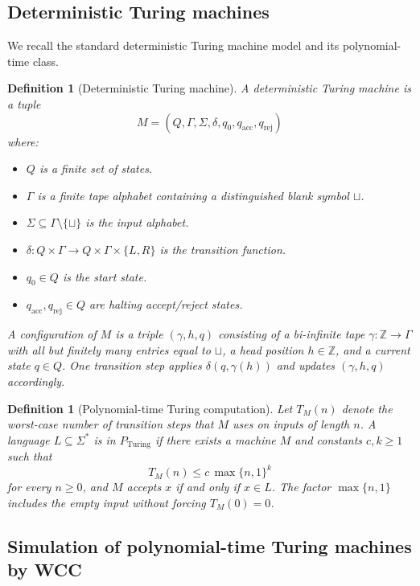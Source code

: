 \documentclass[12pt]{article}
\newcommand{\blank}{\sqcup}
\newtheorem{definition}[theorem]{Definition}
\begin{document}
\subsection{Deterministic Turing machines}

We recall the standard deterministic Turing machine model and its
polynomial-time class.

\begin{definition}[Deterministic Turing machine]
\label{def:tm}
A deterministic Turing machine is a tuple
\[
M = (Q, \Gamma, \Sigma, \delta, q_0, q_{\mathrm{acc}}, q_{\mathrm{rej}})
\]
where:
\begin{itemize}
  \item $Q$ is a finite set of states.
  \item $\Gamma$ is a finite tape alphabet containing a distinguished blank
    symbol $\blank$.
  \item $\Sigma \subseteq \Gamma \setminus \{\blank\}$ is the input alphabet.
  \item $\delta : Q \times \Gamma \to Q \times \Gamma \times \{L,R\}$ is the
    transition function.
  \item $q_0 \in Q$ is the start state.
  \item $q_{\mathrm{acc}}, q_{\mathrm{rej}} \in Q$ are halting accept/reject
    states.
\end{itemize}
A \emph{configuration} of $M$ is a triple $(\gamma, h, q)$ consisting of a
bi-infinite tape $\gamma : \mathbb{Z} \to \Gamma$ with all but finitely many
entries equal to $\blank$, a head position $h \in \mathbb{Z}$, and a current
state $q \in Q$. One transition step applies $\delta(q,\gamma(h))$ and updates
$(\gamma,h,q)$ accordingly.
\end{definition}

\begin{definition}[Polynomial-time Turing computation]
\label{def:pturing}
Let $T_M(n)$ denote the worst-case number of transition steps that $M$ uses on
inputs of length $n$. A language $L \subseteq \Sigma^*$ is in $P_{\mathrm{Turing}}$
if there exists a machine $M$ and constants $c,k \ge 1$ such that
\[
T_M(n) \le c\,\max\{n,1\}^k
\]
for every $n\ge 0$, and $M$ accepts $x$ if and only if $x \in L$.
The factor $\max\{n,1\}$ includes the empty input without forcing $T_M(0)=0$.
\end{definition}

\subsection{Simulation of polynomial-time Turing machines by WCC}
\end{document}
